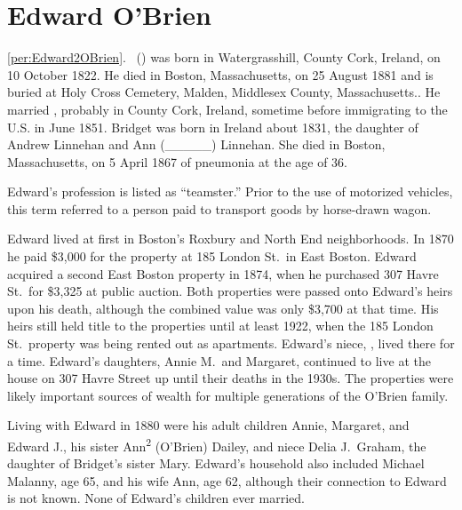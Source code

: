 \section{Edward O'Brien}

\ref{per:Edward2OBrien}.\  () was born in Watergrasshill, County Cork, Ireland, on 10 October 1822.\cite{Edward2OBrienNaturalization} He died in Boston, Massachusetts, on 25 August 1881\cite{Edward2OBrienDeath} and is buried at Holy Cross Cemetery, Malden, Middlesex County, Massachusetts.\cite{CarolGordon}. He married , probably in County Cork, Ireland, sometime before immigrating to the U.S. in June  1851.\cite{Edward2OBrienNaturalization,Edward2OBrienMarriage} Bridget was born in Ireland about 1831, the daughter of Andrew Linnehan and Ann (\_\_\_\_\_) Linnehan. She died in Boston, Massachusetts, on 5 April 1867 of pneumonia at the age of 36.\cite{BridgetLinnehanDeath}

Edward's profession is listed as ``teamster.''\cite{LondonStDeed,Edward2OBrien1876} Prior to the use of motorized vehicles, this term referred to a person paid to transport goods by horse-drawn wagon.\cite{Teamster}

Edward lived at first in Boston's Roxbury\cite{MaryAnn3OBrienBirth} and North End\cite{Edward3OBrienBirth} neighborhoods. In 1870 he paid \$3,000 for the property at 185 London St.\ in East Boston.\cite{LondonStDeed,LondonStMap} Edward acquired a second East Boston property in 1874, when he purchased 307 Havre St.\ for \$3,325 at public auction.\cite{HavrePurchase,HavreMap} Both properties were passed onto Edward's heirs upon his death, although the combined value was only \$3,700 at that time.\cite{Edward2OBrienProbate} His heirs still held title to the properties until at least 1922,\cite{Bromley1922} when the 185 London St.\ property was being rented out as apartments.\cite{GlobeRobbery} Edward's niece, , lived there for a time.\cite{Frances3OBrien1914} Edward's daughters, Annie M.\ and Margaret, continued to live at the house on 307 Havre Street up until their deaths in the 1930s.\cite{AnnMaria3OBrienDeath,Margaret3OBrienDeath} The properties were likely important sources of wealth for multiple generations of the O'Brien family.

Living with Edward in 1880 were his adult children Annie, Margaret, and Edward J., his sister Ann\textsuperscript{2} (O'Brien) Dailey, and niece Delia J.\ Graham, the daughter of Bridget's sister Mary. Edward's household also included Michael Malanny, age 65, and his wife Ann, age 62, although their connection to Edward is not known.\cite{Census1880Edward} None of Edward's children ever married. 


